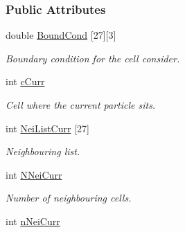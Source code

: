 \subsubsection*{\-Public \-Attributes}
\begin{DoxyCompactItemize}
\item 
\hypertarget{classDomDecBasics_ae47fdfe8f7b7de2ed9a00d0109696435}{double \hyperlink{classDomDecBasics_ae47fdfe8f7b7de2ed9a00d0109696435}{\-Bound\-Cond} \mbox{[}27\mbox{]}\mbox{[}3\mbox{]}}\label{classDomDecBasics_ae47fdfe8f7b7de2ed9a00d0109696435}

\begin{DoxyCompactList}\small\item\em \-Boundary condition for the cell consider. \end{DoxyCompactList}\item 
\hypertarget{classDomDecBasics_ab8d5dea32bdd50bc532a901e60a98067}{int \hyperlink{classDomDecBasics_ab8d5dea32bdd50bc532a901e60a98067}{c\-Curr}}\label{classDomDecBasics_ab8d5dea32bdd50bc532a901e60a98067}

\begin{DoxyCompactList}\small\item\em \-Cell where the current particle sits. \end{DoxyCompactList}\item 
\hypertarget{classDomDecBasics_a3f1699016098a6e8062fb140b2833206}{int \hyperlink{classDomDecBasics_a3f1699016098a6e8062fb140b2833206}{\-Nei\-List\-Curr} \mbox{[}27\mbox{]}}\label{classDomDecBasics_a3f1699016098a6e8062fb140b2833206}

\begin{DoxyCompactList}\small\item\em \-Neighbouring list. \end{DoxyCompactList}\item 
\hypertarget{classDomDecBasics_a16f1ee8ae2cd837bc80f24b844e50575}{int \hyperlink{classDomDecBasics_a16f1ee8ae2cd837bc80f24b844e50575}{\-N\-Nei\-Curr}}\label{classDomDecBasics_a16f1ee8ae2cd837bc80f24b844e50575}

\begin{DoxyCompactList}\small\item\em \-Number of neighbouring cells. \end{DoxyCompactList}\item 
\hypertarget{classDomDecBasics_a8c4a3cbd2beb1d216432d9659a8115b9}{int \hyperlink{classDomDecBasics_a8c4a3cbd2beb1d216432d9659a8115b9}{n\-Nei\-Curr}}\label{classDomDecBasics_a8c4a3cbd2beb1d216432d9659a8115b9}


\end{DoxyCompactItemize}
